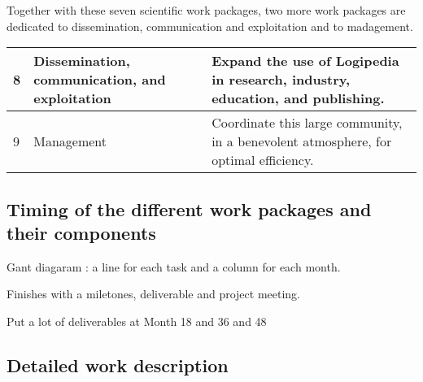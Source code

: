 Together with these seven scientific work packages, 
two more work packages are dedicated to dissemination, communication and
exploitation and to madagement.
\begin{longtable}{|p{}|p{}|p{}|}
\hline
8
&
Dissemination, communication, and exploitation
&
Expand the use of Logipedia in research, industry, education, and publishing.
\\
\hline
9
&
Management
&
Coordinate this large community, in a benevolent atmosphere, for optimal
efficiency.
\\
\hline
\end{longtable}

\subsection{Timing of the different work packages and their components}

Gant diagaram : a line for each task
and a column for each month.

Finishes with a miletones, deliverable and project meeting.

Put a lot of deliverables at Month 18 and 36 and 48

\ganttchart[draft,xscale=.45] 


\subsection{Detailed work description}

\wpfigstyle{\footnotesize}

\begin{workplan}
\newpage

\newpage  

\newpage  

\newpage  

\newpage

\newpage

\newpage

\newpage

\newpage

\end{workplan}

